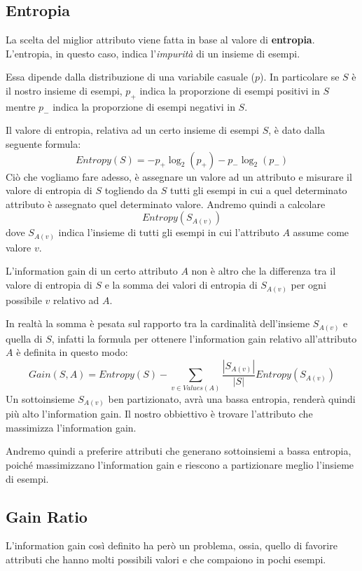 \subsection{Entropia}
La scelta del miglior attributo viene fatta in base al valore di \textbf{entropia}. L'entropia, in questo caso, indica
l'\emph{impurit\`a} di un insieme di esempi.

Essa dipende dalla distribuzione di una variabile casuale ($p$). In particolare se $S$ \`e il nostro insieme di esempi,
$p_+$ indica la proporzione di esempi positivi in $S$ mentre $p_-$ indica la proporzione di esempi negativi in $S$.

Il valore di entropia, relativa ad un certo insieme di esempi $S$, \`e dato dalla seguente formula:
\[ Entropy(S) = -p_+ \log_2{(p_+)} - p_- \log_2{(p_-)} \]
Ci\`o che vogliamo fare adesso, \`e assegnare un valore ad un attributo e misurare il valore di entropia di $S$
togliendo da $S$ tutti gli esempi in cui a quel determinato attributo \`e assegnato quel determinato valore. Andremo
quindi a calcolare
\[ Entropy(S_{A(v)}) \]
dove $S_{A(v)}$ indica l'insieme di tutti gli esempi in cui l'attributo $A$ assume come valore $v$.

L'information gain di un certo attributo $A$ non \`e altro che la differenza tra il valore di entropia di $S$ e la
somma dei valori di entropia di $S_{A(v)}$ per ogni possibile $v$ relativo ad $A$.

In realt\`a la somma \`e pesata sul rapporto tra la cardinalit\`a dell'insieme $S_{A(v)}$ e quella di $S$, infatti
la formula per ottenere l'information gain relativo all'attributo $A$ \`e definita in questo modo:
\[ Gain(S, A) = Entropy(S) - \sum_{v \in Values(A)} \frac{|S_{A(v)}|}{|S|} Entropy(S_{A(v)}) \]
Un sottoinsieme $S_{A(v)}$ ben partizionato, avr\`a una bassa entropia, render\`a quindi pi\`u alto l'information gain.
Il nostro obbiettivo \`e trovare l'attributo che massimizza l'information gain.

Andremo quindi a preferire attributi che generano sottoinsiemi a bassa entropia, poich\'e massimizzano l'information
gain e riescono a partizionare meglio l'insieme di esempi.

\subsection{Gain Ratio}
L'information gain cos\`i definito ha per\`o un problema, ossia, quello di favorire attributi che hanno molti possibili
valori e che compaiono in pochi esempi.

